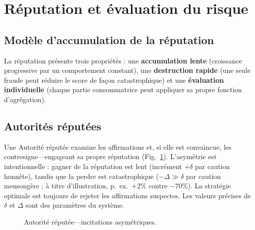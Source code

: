 \documentclass[11pt,a4paper,twocolumn]{article}
\begin{document}
\section{Réputation et évaluation du risque}

\subsection{Modèle d'accumulation de la réputation}

La réputation présente trois propriétés : une \textbf{accumulation lente} (croissance progressive par un comportement constant), une \textbf{destruction rapide} (une seule fraude peut réduire le score de façon catastrophique) et une \textbf{évaluation individuelle} (chaque partie consommatrice peut appliquer sa propre fonction d'agrégation).

\subsection{Autorités réputées}

Une Autorité réputée examine les affirmations et, si elle est convaincue, les contresigne---engageant sa propre réputation (Fig.~\ref{fig:authority}). L'asymétrie est intentionnelle : gagner de la réputation est lent (incrément $+\delta$ par caution honnête), tandis que la perdre est catastrophique ($-\Delta \gg \delta$ par caution mensongère ; à titre d'illustration, p.\ ex.\ $+2\%$ contre $-70\%$). La stratégie optimale est toujours de rejeter les affirmations suspectes. Les valeurs précises de $\delta$ et $\Delta$ sont des paramètres du système.

\begin{figure}[ht]
\centering
{}
\caption{Autorité réputée---incitations asymétriques.}
\label{fig:authority}
\end{figure}
\end{document}
